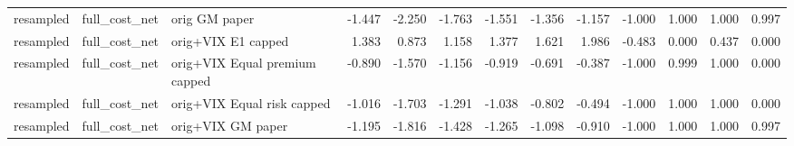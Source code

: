 \begin{tabular}{lllrrrrrrrrrr}
resampled & full\_cost\_net & orig GM paper & -1.447 & -2.250 & -1.763 & -1.551 & -1.356 & -1.157 & -1.000 & 1.000 & 1.000 & 0.997 \\
resampled & full\_cost\_net & orig+VIX E1 capped & 1.383 & 0.873 & 1.158 & 1.377 & 1.621 & 1.986 & -0.483 & 0.000 & 0.437 & 0.000 \\
resampled & full\_cost\_net & orig+VIX Equal premium capped & -0.890 & -1.570 & -1.156 & -0.919 & -0.691 & -0.387 & -1.000 & 0.999 & 1.000 & 0.000 \\
resampled & full\_cost\_net & orig+VIX Equal risk capped & -1.016 & -1.703 & -1.291 & -1.038 & -0.802 & -0.494 & -1.000 & 1.000 & 1.000 & 0.000 \\
resampled & full\_cost\_net & orig+VIX GM paper & -1.195 & -1.816 & -1.428 & -1.265 & -1.098 & -0.910 & -1.000 & 1.000 & 1.000 & 0.997 \\
\bottomrule
\end{tabular}
